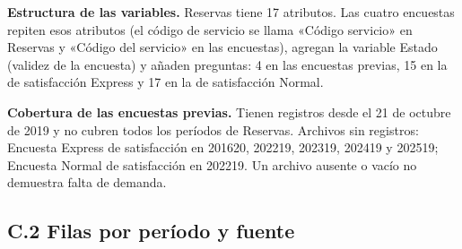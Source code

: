 \documentclass[11pt,letterpaper]{article}
\begin{document}
\textbf{Estructura de las variables.} Reservas tiene 17 atributos. Las cuatro encuestas repiten esos atributos (el código de servicio se llama «Código servicio» en Reservas y «Código del servicio» en las encuestas), agregan la variable Estado (validez de la encuesta) y añaden preguntas: 4 en las encuestas previas, 15 en la de satisfacción Express y 17 en la de satisfacción Normal.

\textbf{Cobertura de las encuestas previas.} Tienen registros desde el 21 de octubre de 2019 y no cubren todos los períodos de Reservas. Archivos sin registros: Encuesta Express de satisfacción en 201620, 202219, 202319, 202419 y 202519; Encuesta Normal de satisfacción en 202219. Un archivo ausente o vacío no demuestra falta de demanda.

\subsection*{C.2 Filas por período y fuente}
\end{document}
